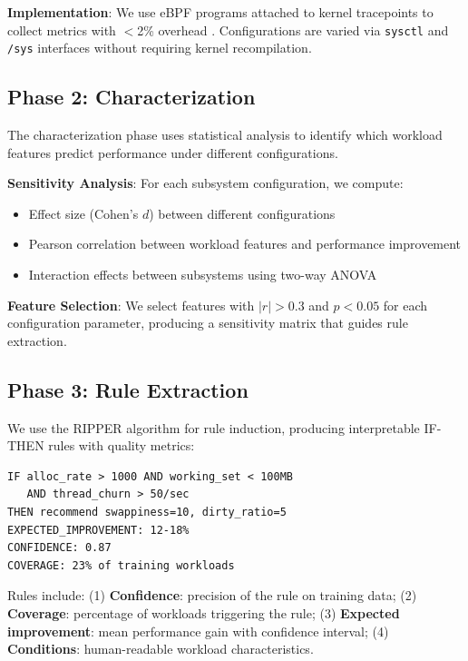 \documentclass[11pt,a4paper]{article}
\begin{document}
\textbf{Implementation}: We use eBPF programs attached to kernel tracepoints to collect metrics with $<$2\% overhead \citep{craun2024eliminating}. Configurations are varied via \texttt{sysctl} and \texttt{/sys} interfaces without requiring kernel recompilation.

\subsection{Phase 2: Characterization}

The characterization phase uses statistical analysis to identify which workload features predict performance under different configurations.

\textbf{Sensitivity Analysis}: For each subsystem configuration, we compute:
\begin{itemize}
    \item Effect size (Cohen's $d$) between different configurations
    \item Pearson correlation between workload features and performance improvement
    \item Interaction effects between subsystems using two-way ANOVA
\end{itemize}

\textbf{Feature Selection}: We select features with $|r| > 0.3$ and $p < 0.05$ for each configuration parameter, producing a sensitivity matrix that guides rule extraction.

\subsection{Phase 3: Rule Extraction}

We use the RIPPER algorithm \citep{cohen1995ripper} for rule induction, producing interpretable IF-THEN rules with quality metrics:

\begin{verbatim}
IF alloc_rate > 1000 AND working_set < 100MB 
   AND thread_churn > 50/sec
THEN recommend swappiness=10, dirty_ratio=5
EXPECTED_IMPROVEMENT: 12-18%
CONFIDENCE: 0.87
COVERAGE: 23% of training workloads
\end{verbatim}

Rules include: (1) \textbf{Confidence}: precision of the rule on training data; (2) \textbf{Coverage}: percentage of workloads triggering the rule; (3) \textbf{Expected improvement}: mean performance gain with confidence interval; (4) \textbf{Conditions}: human-readable workload characteristics.
\end{document}
